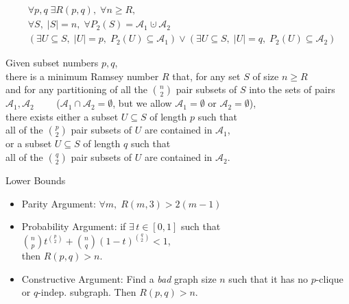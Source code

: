\documentclass[letterpaper,12pt]{article}
\author{Dylan Hutchison}
\newenvironment{myindentpar}[1]%
 {\begin{list}{}%
         {\setlength{\leftmargin}{#1}}%
         \item[]%
 }
 {\end{list}}
\begin{document}
\begin{align*}
&\forall p,q \;\exists R(p,q),\; \forall n \geq R, \\
&\forall S, \;|S|=n, \;\forall P_2(S)=\mathcal{A}_1 \cupdot \mathcal{A}_2 \\
&(\exists U \subseteq S, \; |U|=p, \; P_2(U) \subseteq \mathcal{A}_1) \lor (\exists U \subseteq S, \; |U|=q, \; P_2(U) \subseteq \mathcal{A}_2) 
\end{align*}

\begin{myindentpar}{2em}
Given subset numbers $p,q$, \\
there is a minimum Ramsey number $R$ that, for any set $S$ of size $n \geq R$ \\
and for any partitioning of all the $\binom{n}{2}$ pair subsets of $S$ into the sets of pairs \\
\phantom{$\qquad$} $\mathcal{A}_1, \mathcal{A}_2 \qquad$ ($\mathcal{A}_1 \cap \mathcal{A}_2 = \emptyset$, but we allow $\mathcal{A}_1 = \emptyset$ or $\mathcal{A}_2 = \emptyset$), \\
there exists either a subset $U \subseteq S$ of length $p$ such that \\
\phantom{$\qquad$} all of the $\binom{p}{2}$ pair subsets of $U$ are contained in $\mathcal{A}_1$, \\
or a subset $U \subseteq S$ of length $q$ such that \\
\phantom{$\qquad$} all of the $\binom{q}{2}$ pair subsets of $U$ are contained in $\mathcal{A}_2$.
\end{myindentpar}

Lower Bounds
\begin{itemize}
\item Parity Argument: $\forall m, \; R(m,3) > 2(m-1)$
\item Probability Argument: if $\exists\, t \in [0,1]$ such that $\binom{n}{p}t^{\binom{p}{2}} + \binom{n}{q}(1-t)^{\binom{q}{2}} < 1$, \\
\phantom{Probability Argument:} then $R(p,q) > n$.
\item Constructive Argument: Find a \textit{bad} graph size $n$ such that it has no $p$-clique \\
\phantom{Constructive Argument:} or $q$-indep. subgraph. Then $R(p,q) > n$.
\end{itemize}
\end{document}
